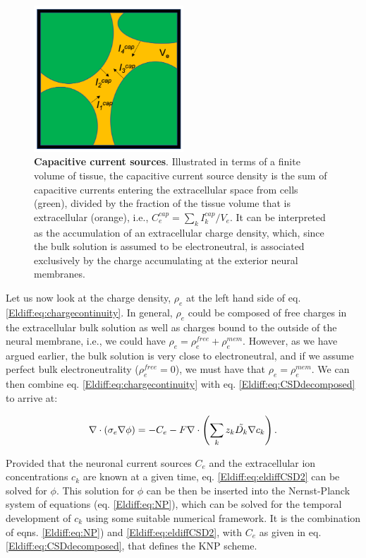 \begin{figure}[!ht]
\begin{center}
\includegraphics[width=0.5\textwidth]{Figures/Eldiff/KNP_Cap_illustration.png}
\end{center}
\caption{\textbf{Capacitive current sources}. Illustrated in terms of a finite volume of tissue, the capacitive current source density is the sum of capacitive currents entering the extracellular space from cells (green), divided by the fraction of the tissue volume that is extracellular (orange), i.e., $C_e^{cap} = \sum_k I_k^{cap}/V_e$. It can be interpreted as the accumulation of an extracellular charge density, which, since the bulk solution is assumed to be electroneutral, is associated exclusively by the charge accumulating at the exterior neural membranes.}
\label{Eldiff:fig:Ccap}
\end{figure}

Let us now look at the charge density, $\rho_e$ at the left hand side of eq. \ref{Eldiff:eq:chargecontinuity}. In general, $\rho_e$ could be composed of free charges in the extracellular bulk solution as well as charges bound to the outside of the neural membrane, i.e., we could have $\rho_e = \rho_e^{free} + \rho_e^{mem}$. However, as we have argued earlier, the bulk solution is very close to electroneutral, and if we assume perfect bulk electroneutrality ($\rho_e^{free} = 0$), we must have that $\rho_e=\rho_e^{mem}$. We can then combine eq. \ref{Eldiff:eq:chargecontinuity} with eq. \ref{Eldiff:eq:CSDdecomposed} to arrive at:

\begin{equation}
\nabla \cdot (\sigma_e\nabla\phi) = - C_e - F \nabla \cdot \left (\sum_k{z_k \tilde{D_k}{\bf \nabla} c_{k}} \right).
\label{Eldiff:eq:eldiffCSD2}
\end{equation}

Provided that the neuronal current sources $C_e$ and the extracellular ion concentrations $c_k$ are known at a given time, eq. \ref{Eldiff:eq:eldiffCSD2} can be solved for $\phi$. This solution for $\phi$ can be then be inserted into the Nernst-Planck system of equations (eq. \ref{Eldiff:eq:NP}), 
which can be solved for the temporal development of $c_k$ using some suitable numerical framework. It is the combination of eqns. \ref{Eldiff:eq:NP}) and \ref{Eldiff:eq:eldiffCSD2}, with $C_e$ as given in eq. \ref{Eldiff:eq:CSDdecomposed}, that defines the KNP scheme. 


